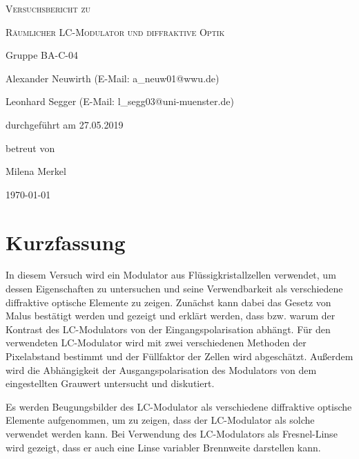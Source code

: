\documentclass[
	a4paper,
	12pt,
	pagesize,
	ngerman
]{scrartcl}
\begin{document}
	\begin{titlepage}
		\centering
		{\scshape\LARGE Versuchsbericht zu \par}
		\vspace{1cm}
		{\scshape\huge Räumlicher LC-Modulator und diffraktive Optik \par}
		\vspace{2.5cm}
		{\LARGE Gruppe BA-C-04 \par}
		\vspace{0.5cm}

		{\large Alexander Neuwirth (E-Mail: a\_neuw01@wwu.de) \par}
		{\large Leonhard Segger (E-Mail: l\_segg03@uni-muenster.de) \par}
		\vfill

		durchgeführt am 27.05.2019\par
		betreut von\par
		{\large Milena Merkel}

		\vfill

		{\large \today\par}
	\end{titlepage}
	\tableofcontents
	\newpage

	\section{Kurzfassung}
	In diesem Versuch wird ein Modulator aus Flüssigkristallzellen verwendet, um dessen Eigenschaften zu untersuchen und seine Verwendbarkeit als verschiedene diffraktive optische Elemente zu zeigen.
	Zunächst kann dabei das Gesetz von Malus bestätigt werden und gezeigt und erklärt werden, dass bzw. warum der Kontrast des LC-Modulators von der Eingangspolarisation abhängt.
	Für den verwendeten LC-Modulator wird mit zwei verschiedenen Methoden der Pixelabstand bestimmt und der Füllfaktor der Zellen wird abgeschätzt.
	Außerdem wird die Abhängigkeit der Ausgangspolarisation des Modulators von dem eingestellten Grauwert untersucht und diskutiert.

	Es werden Beugungsbilder des LC-Modulator als verschiedene diffraktive optische Elemente aufgenommen, um zu zeigen, dass der LC-Modulator als solche verwendet werden kann.
	Bei Verwendung des LC-Modulators als Fresnel-Linse wird gezeigt, dass er auch eine Linse variabler Brennweite darstellen kann.
\end{document}
